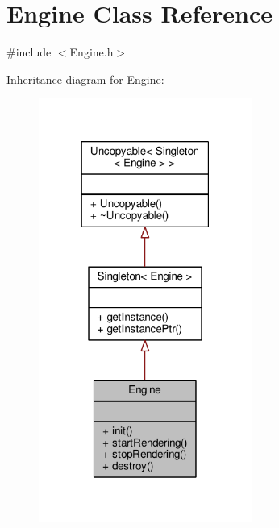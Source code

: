 \hypertarget{classEngine}{\section{Engine Class Reference}
\label{classEngine}
}


{\ttfamily \#include $<$Engine.\-h$>$}



Inheritance diagram for Engine\-:
\nopagebreak
\begin{figure}[H]
\begin{center}
\leavevmode
\includegraphics[width=198pt]{classEngine__inherit__graph}
\end{center}
\end{figure}


